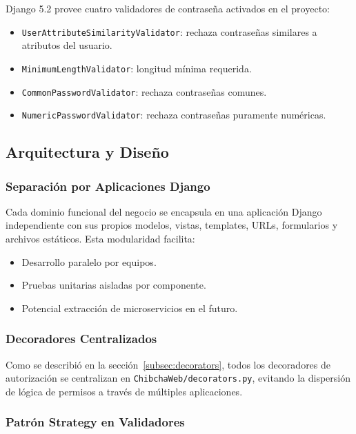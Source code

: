\documentclass[12pt, a4paper]{article}
\begin{document}
{Django 5.2 provee cuatro validadores de contraseña activados en el proyecto:
\begin{itemize}
    \item \texttt{UserAttributeSimilarityValidator}: rechaza contraseñas similares a atributos del usuario.
    \item \texttt{MinimumLengthValidator}: longitud mínima requerida.
    \item \texttt{CommonPasswordValidator}: rechaza contraseñas comunes.
    \item \texttt{NumericPasswordValidator}: rechaza contraseñas puramente numéricas.
\end{itemize}

\subsection{Arquitectura y Diseño}

\subsubsection{Separación por Aplicaciones Django}

Cada dominio funcional del negocio se encapsula en una aplicación Django independiente con sus propios modelos, vistas, templates, URLs, formularios y archivos estáticos. Esta modularidad facilita:
\begin{itemize}
    \item Desarrollo paralelo por equipos.
    \item Pruebas unitarias aisladas por componente.
    \item Potencial extracción de microservicios en el futuro.
\end{itemize}

\subsubsection{Decoradores Centralizados}

Como se describió en la sección~\ref{subsec:decorators}, todos los decoradores de autorización se centralizan en \texttt{ChibchaWeb/decorators.py}, evitando la dispersión de lógica de permisos a través de múltiples aplicaciones.

\subsubsection{Patrón Strategy en Validadores}

}
\end{document}
